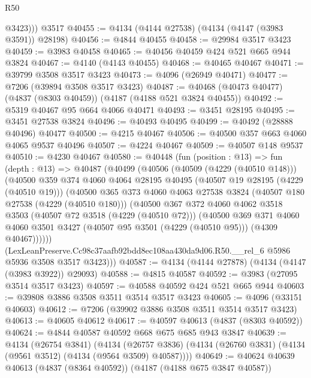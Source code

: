 \begin{lexlean}{R50}
\begin{coremodule}
          @3423)))
    @3517
@40455 := @4134 (@4144 @27538) (@4134 (@4147 (@3983 @3591)) @28198)
@40456 := @4844 @40455
@40458 := @29984 @3517 @3423
@40459 := @3983 @40458
@40465 := @40456 @40459 @424 @521 @665 @944 @3824
@40467 := @4140 (@4143 @40455)
@40468 := @40465 @40467
@40471 := @39799 @3508 @3517 @3423
@40473 := @4096 (@26949 @40471)
@40477 := @7206 (@39894 @3508 @3517 @3423)
@40487 := @40468 (@40473 @40477) (@4837 (@8303 @40459)) (@4187 (@4188 @521 @3824 @40455))
@40492 := @5319 @40467 @95 @664 @4066 @40471
@40493 := @3451 @28195
@40495 := @3451 @27538 @3824
@40496 := @40493 @40495
@40499 := @40492 (@28888 @40496) @40477
@40500 := @4215 @40467
@40506 := @40500 @357 @663 @4060 @4065 @9537 @40496
@40507 := @4224 @40467
@40509 := @40507 @148 @9537
@40510 := @4230 @40467
@40580 := @40448
    (fun (position : @13) =>
    fun (depth : @13) =>
    @40487
      (@40499
        (@40506
          (@40509 (@4229 (@40510 @148)))
          (@40500
            @359
            @374
            @4060
            @4064
            @28195
            @40495
            (@40507 @19 @28195 (@4229 (@40510 @19)))
            (@40500
              @365
              @373
              @4060
              @4063
              @27538
              @3824
              (@40507 @180 @27538 (@4229 (@40510 @180)))
              (@40500
                @367
                @372
                @4060
                @4062
                @3518
                @3503
                (@40507 @72 @3518 (@4229 (@40510 @72)))
                (@40500
                  @369
                  @371
                  @4060
                  @4060
                  @3501
                  @3427
                  (@40507 @95 @3501 (@4229 (@40510 @95)))
                  (@4309 @40467))))))
        (LexLeanPreserve.Cc98c37aafb92bdd8ec108aa430da9d06.R50.__rel_6
          @5986
          @5936
          @3508
          @3517
          @3423)))
@40587 := @4134 (@4144 @27878) (@4134 (@4147 (@3983 @3922)) @29093)
@40588 := @4815 @40587
@40592 := @3983 (@27095 @3514 @3517 @3423)
@40597 := @40588 @40592 @424 @521 @665 @944
@40603 := @39808 @3886 @3508 @3511 @3514 @3517 @3423
@40605 := @4096 (@33151 @40603)
@40612 := @7206 (@39902 @3886 @3508 @3511 @3514 @3517 @3423)
@40613 := @40605 @40612
@40617 := @40597 @40613 (@4837 (@8303 @40592))
@40624 := @4844 @40587 @40592 @668 @675 @685 @943 @3847
@40639 := @4134
    (@26754 @3841)
    (@4134 (@26757 @3836) (@4134 (@26760 @3831) (@4134 (@9561 @3512) (@4134 (@9564 @3509) @40587))))
@40649 := @40624 @40639 @40613 (@4837 (@8364 @40592)) (@4187 (@4188 @675 @3847 @40587))

\end{coremodule}
\end{lexlean}
